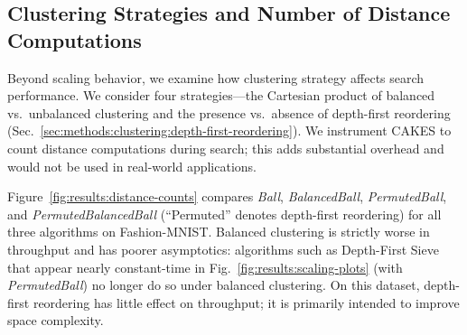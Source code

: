 \subsection{Clustering Strategies and Number of Distance Computations}
\label{sec:results:clustering-strategies-and-number-of-distance-computations}


Beyond scaling behavior, we examine how clustering strategy affects search performance. We consider four strategies—the Cartesian product of balanced vs.\ unbalanced clustering and the presence vs.\ absence of depth-first reordering (Sec.~\ref{sec:methods:clustering:depth-first-reordering}). We instrument CAKES to count distance computations during search; this adds substantial overhead and would not be used in real-world applications.

Figure~\ref{fig:results:distance-counts} compares \textit{Ball}, \textit{BalancedBall}, \textit{PermutedBall}, and \textit{PermutedBalancedBall} (``Permuted'' denotes depth-first reordering) for all three algorithms on Fashion-MNIST. Balanced clustering is strictly worse in throughput and has poorer asymptotics: algorithms such as Depth-First Sieve that appear nearly constant-time in Fig.~\ref{fig:results:scaling-plots} (with \textit{PermutedBall}) no longer do so under balanced clustering. On this dataset, depth-first reordering has little effect on throughput; it is primarily intended to improve space complexity.



